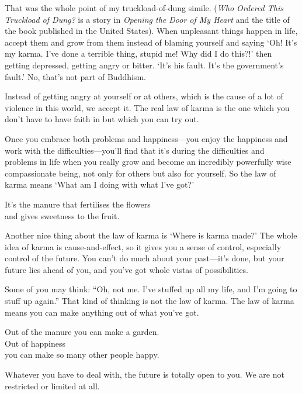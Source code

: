 \documentclass[12pt, openany]{book}
\newenvironment{aphorism}%
{%
\begin{center}\begin{itshape}
}%
{\end{itshape}\end{center}
}%
\begin{document}
That was the whole point of my truckload-of-dung simile. (\emph{Who Ordered This Truckload of Dung?} is a story in \emph{Opening the Door of My Heart} and the title of the book published in the United States). When unpleasant things happen in life, accept them and grow from them instead of blaming yourself and saying ‘Oh! It’s my karma. I’ve done a terrible thing, stupid me! Why did I do this?!’ then getting depressed, getting angry or bitter. ‘It’s his fault. It’s the government’s fault.’ No, that’s not part of Buddhism. 

Instead of getting angry at yourself or at others, which is the cause of a lot of violence in this world, we accept it. The real law of karma is the one which you don’t have to have faith in but which you can try out. 

Once you embrace both problems and happiness—you enjoy the happiness and work with the difficulties—you’ll find that it’s during the difficulties and problems in life when you really grow and become an incredibly powerfully wise compassionate being, not only for others but also for yourself. So the law of karma means ‘What am I doing with what I’ve got?’ 

\begin{aphorism}
It’s the manure that fertilises the flowers\\  
and gives sweetness to the fruit.
\end{aphorism}

Another nice thing about the law of karma is ‘Where is karma made?’ The whole idea of karma is cause-and-effect, so it gives you a sense of control, especially control of the future. You can’t do much about your past—it’s done, but your future lies ahead of you, and you’ve got whole vistas of possibilities. 

Some of you may think: “Oh, not me. I’ve stuffed up all my life, and I’m going to stuff up again.” That kind of thinking is not the law of karma. The law of karma means you can make anything out of what you’ve got. 

\begin{aphorism}
Out of the manure you can make a garden.\\  
Out of happiness\\ 
you can make so many other people happy.
\end{aphorism}

Whatever you have to deal with, the future is totally open to you. We are not restricted or limited at all. 
\end{document}
